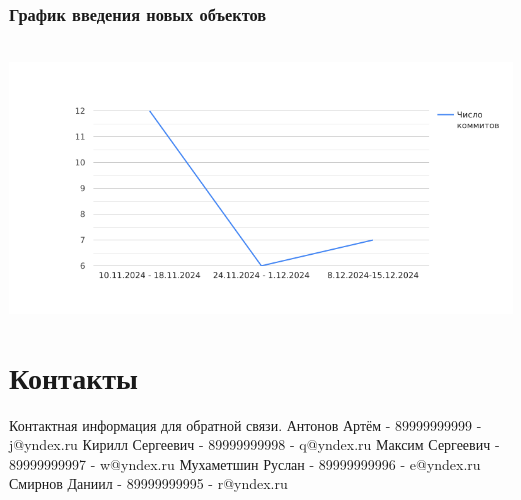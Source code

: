 \documentclass{article}
\begin{document}
\subsubsection{График введения новых объектов}
\\
\includegraphics[width=0.3\linewidth]{images/chart.png}\\

\newpage

\section{Контакты}
Контактная информация для обратной связи. \newline
Антонов Артём - 89999999999 - j@yndex.ru\newline
Кирилл Сергеевич - 89999999998 - q@yndex.ru\newline
Максим Сергеевич - 89999999997 - w@yndex.ru\newline
Мухаметшин Руслан - 89999999996 - e@yndex.ru\newline
Смирнов Даниил - 89999999995 - r@yndex.ru
\end{document}
